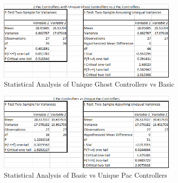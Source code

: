 \documentclass{article}
\begin{document}
\begin{flushleft}
\begin{figure}[h]
	\centering
	\includegraphics[width=0.8\textwidth]{stats2UniqueGhostVsDefault}
	\caption{Statistical Analysis of Unique Ghost Controllers vs Basic}
\end{figure}

\vspace{15mm}

\begin{figure}[h]
	\centering
	\includegraphics[width=0.8\textwidth]{stats2VsUniquePac}
	\caption{Statistical Analysis of Basic vs Unique Pac Controllers}
\end{figure}
\end{flushleft}

\clearpage
\end{document}
